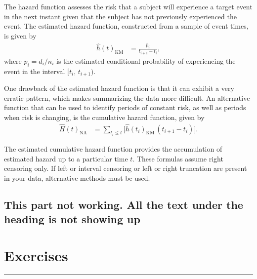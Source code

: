 \documentclass[
]{report}
\let\theexcount\relax
\begin{document}
The hazard function assesses the risk that a subject will experience a target event in the next instant given that the subject has not previously experienced the event. The estimated hazard function, constructed from a sample of event times, is given by
\begin{align}
\hat h(t)_{\mathrm{KM}} &= \frac{\hat p_i}{t_{i+1} - t_i},
\end{align}
where \(\hat p_i = d_i / n_i\) is the estimated conditional probability of experiencing the event in the interval \([t_i,\,t_{i+1})\).

One drawback of the estimated hazard function is that it can exhibit a very erratic pattern, which makes summarizing the data more difficult. An alternative function that can be used to identify periods of constant risk, as well as periods when risk is changing, is the cumulative hazard function, given by
\begin{align}
\widehat H(t)_{\mathrm{NA}}
&= \sum_{t_i \le t}
\bigl[\hat h(t_i)_{\mathrm{KM}}\,(t_{i+1} - t_i)\bigr].
\end{align}

The estimated cumulative hazard function provides the accumulation of estimated hazard up to a particular time \(t\). These formulas assume right censoring only. If left or interval censoring or left or right truncation are present in your data, alternative methods must be used.

\subsection{This part not working. All the text under the heading is not showing up}\label{this-part-not-working.-all-the-text-under-the-heading-is-not-showing-up}

\section*{\texorpdfstring{\textbf{Exercises}}{Exercises}}\label{exercises-3}

\vspace{-2em}

\noindent

\rule{\linewidth}{0.4pt}

\renewcommand{\theexcount}{E\arabic{excount}}
\end{document}
